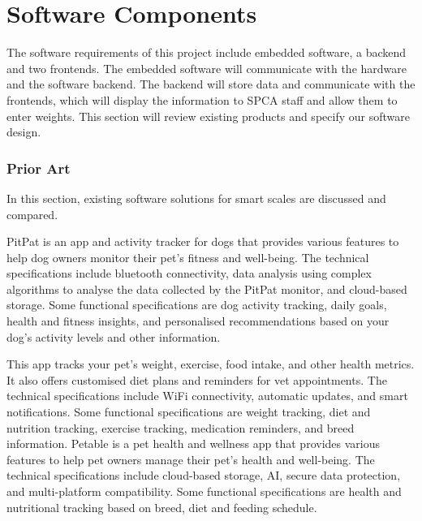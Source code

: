
\chapter{Software Components}

The software requirements of this project include embedded software, a backend and two frontends. The embedded software will communicate with the hardware and the software backend. The backend will store data and communicate with the frontends, which will display the information to SPCA staff and allow them to enter weights. This section will review existing products and specify our software design. 

\subsection{Prior Art}

In this section, existing software solutions for smart scales are discussed and compared.

PitPat is an app and activity tracker for dogs that provides various features to help dog owners monitor their pet's fitness and well-being. The technical specifications include bluetooth connectivity, data analysis using complex algorithms to analyse the data collected by the PitPat monitor, and cloud-based storage. Some functional specifications are dog activity tracking, daily goals, health and fitness insights, and personalised recommendations based on your dog's activity levels and other information.

This app tracks your pet's weight, exercise, food intake, and other health metrics. It also offers customised diet plans and reminders for vet appointments. The technical specifications include WiFi connectivity, automatic updates, and smart notifications. Some functional specifications are weight tracking, diet and nutrition tracking, exercise tracking, medication reminders, and breed information.
Petable is a pet health and wellness app that provides various features to help pet owners manage their pet's health and well-being. The technical specifications include cloud-based storage, AI, secure data protection, and multi-platform compatibility. Some functional specifications are health and nutritional tracking based on breed, diet and feeding schedule.

